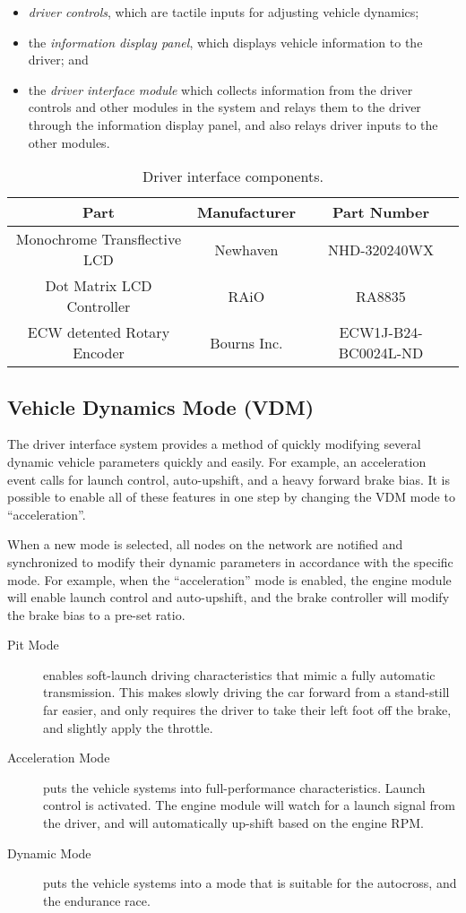\begin{itemize}
\item \emph{driver controls}, which are tactile inputs for adjusting vehicle dynamics; 
\item the \emph{information display panel}, which displays vehicle information to the driver; and
\item the \emph{driver interface module} which collects information from the driver controls and other modules in the system and relays them to the driver through the information display panel, and also relays driver inputs to the other modules.
\end{itemize}

\begin{table}[H]
	\caption{Driver interface components.}
	\label{table:driver_interface_components}
	\centering
	\begin{tabular}{|c|c|c|}
		\hline 
		Part & Manufacturer & Part Number\tabularnewline
		\hline
		\hline 
		Monochrome Transflective LCD & Newhaven & NHD-320240WX\tabularnewline
		\hline 
		Dot Matrix LCD Controller & RAiO & RA8835\tabularnewline
		\hline 
		ECW detented Rotary Encoder & Bourns Inc. & ECW1J-B24-BC0024L-ND\tabularnewline
		\hline
	\end{tabular}
\end{table}

\subsection{Vehicle Dynamics Mode (VDM)}

The driver interface system provides a method of quickly modifying several dynamic vehicle parameters quickly and easily. For example, an acceleration event calls for launch control, auto-upshift, and a heavy forward brake bias. It is possible to enable all of these features in one step by changing the VDM mode to {}``acceleration''. 

When a new mode is selected, all nodes on the network are notified and synchronized to modify their dynamic parameters in accordance with the specific mode. For example, when the  {}``acceleration'' mode is enabled, the engine module will enable launch control and auto-upshift, and the brake controller will modify the brake bias to a pre-set ratio.

\begin{description}
  \item [{Pit Mode}] enables soft-launch driving characteristics that mimic a fully automatic transmission. This makes slowly driving the car forward from a stand-still far easier, and only requires the driver to take their left foot off the brake, and slightly apply the throttle.
  \item [{Acceleration Mode}] puts the vehicle systems into full-performance characteristics. Launch control is activated. The engine module will watch for a launch signal from the driver, and will automatically up-shift based on the engine RPM.
  \item [{Dynamic Mode}] puts the vehicle systems into a mode that is suitable for the autocross, and the endurance race.
\end{description}

